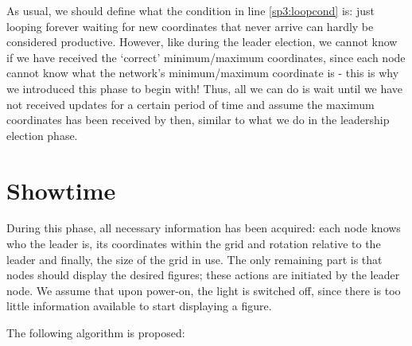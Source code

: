 As usual, we should define what the condition in line \ref{sp3:loopcond} is: just looping forever waiting for new coordinates that never arrive can hardly be considered productive. However, like during the leader election, we cannot know if we have received the `correct' minimum/maximum coordinates, since each node cannot know what the network's minimum/maximum coordinate is - this is why we introduced this phase to begin with! Thus, all we can do is wait until we have not received updates for a certain period of time and assume the maximum coordinates has been received by then, similar to what we do in the leadership election phase.

\section{Showtime}

During this phase, all necessary information has been acquired: each node knows who the leader is, its coordinates within the grid and rotation relative to the leader and finally, the size of the grid in use. The only remaining part is that nodes should display the desired figures; these actions are initiated by the leader node. We assume that upon power-on, the light is switched off, since there is too little information available to start displaying a figure.

The following algorithm is proposed:


